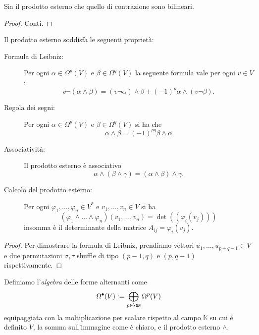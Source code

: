 \documentclass[11pt]{scrartcl}
\newcommand{\KK}{\mathbb{K}}
\begin{document}
	\begin{proposition}
		Sia il prodotto esterno che quello di contrazione sono bilineari.
	\end{proposition}
	\begin{proof}
		Conti.
	\end{proof}
	\begin{theorem}
		Il prodotto esterno soddisfa le seguenti proprietà:
		\begin{description}
			\item[Formula di Leibniz:] Per ogni $\alpha\in \Omega^p(V)$ e $\beta\in \Omega^q(V)$ la seguente formula vale per ogni $v\in V$:
			$$v\lnot \left(\alpha\land \beta\right)=\left(v\lnot \alpha\right)\land \beta +(-1)^p\alpha\land\left(v\lnot \beta\right).$$
			\item[Regola dei segni:] Per ogni $\alpha\in \Omega^p(V)$ e $\beta\in \Omega^q(V)$ si ha che $$\alpha\land \beta=(-1)^{pq}\beta\land \alpha$$
			\item[Associatività:] Il prodotto esterno è associativo
			$$\alpha\land\left(\beta\land \gamma\right)=\left(\alpha\land \beta\right)\land \gamma.$$
			\item[Calcolo del prodotto esterno:] Per ogni $\varphi_1,\dots,\varphi_n\in V^*$ e $v_1,\dots,v_n\in V$ si ha 
			$$\left(\varphi_1\land\dots\land \varphi_n\right)\left(v_1,\dots,v_n\right)=\det\left(\left(\varphi_i(v_j)\right)\right)$$
			insomma è il determinante della matrice $A_{ij}=\varphi_i(v_j)$.
		\end{description}
	\end{theorem}
	\begin{proof}
		Per dimostrare la formula di Leibniz, prendiamo vettori $u_1,\dots,u_{p+q-1}\in V$ e due permutazioni $\sigma,\tau$ shuffle di tipo $(p-1,q)$ e $(p,q-1)$ rispettivamente.
	\end{proof}
	
	\begin{definition}
		Definiamo l'\textit{algebra} delle forme alternanti come
		$$\Omega^\bullet(V):=\bigoplus_{p\in\NN}\Omega^p(V)$$
		equipaggiata con la moltiplicazione per scalare rispetto al campo $\KK$ su cui è definito $V$, la somma sull'immagine come è chiaro, e il prodotto esterno $\land$.
	\end{definition}
	
\end{document}
